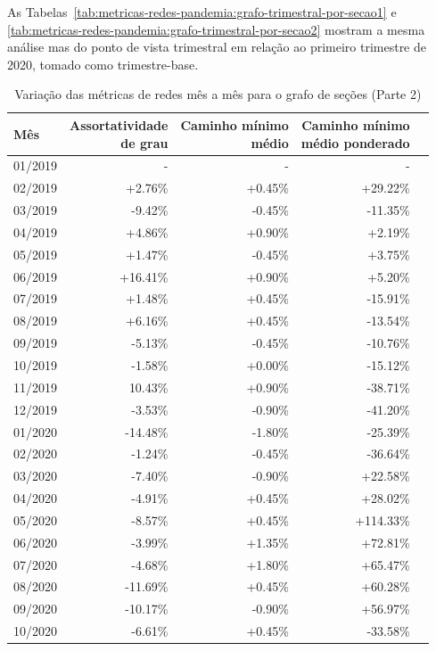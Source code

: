As Tabelas~\ref{tab:metricas-redes-pandemia:grafo-trimestral-por-secao1} e \ref{tab:metricas-redes-pandemia:grafo-trimestral-por-secao2} mostram a mesma análise mas do ponto de vista trimestral em relação ao primeiro trimestre de 2020, tomado como trimestre-base.

\begin{table}[htb]
\centering
\caption{Variação das métricas de redes mês a mês para o grafo de seções (Parte 2)}
\label{tab:metricas-redes-pandemia:grafo-mensal-por-secao2}
\begin{tabular}{l|rrrr}
\toprule
Mês & \shortstack{Assortatividade\\de grau} & \shortstack{Caminho mínimo\\médio} & \shortstack{Caminho mínimo\\médio ponderado} \\
\midrule
01/2019 &  - &  - &  - \\
02/2019 &  +2.76\% & +0.45\% & +29.22\% \\
03/2019 &  -9.42\% & -0.45\% & -11.35\% \\
04/2019 &  +4.86\% & +0.90\% &  +2.19\% \\
05/2019 &  +1.47\% & -0.45\% &  +3.75\% \\
06/2019 & +16.41\% & +0.90\% &  +5.20\% \\
07/2019 &  +1.48\% & +0.45\% & -15.91\% \\
08/2019 &  +6.16\% & +0.45\% & -13.54\% \\
09/2019 &  -5.13\% & -0.45\% & -10.76\% \\
10/2019 &  -1.58\% & +0.00\% & -15.12\% \\
11/2019 &  10.43\% & +0.90\% & -38.71\% \\
12/2019 &  -3.53\% & -0.90\% & -41.20\% \\
01/2020 & -14.48\% & -1.80\% & -25.39\% \\
02/2020 &  -1.24\% & -0.45\% & -36.64\% \\
03/2020 &  -7.40\% & -0.90\% & +22.58\% \\
04/2020 &  -4.91\% & +0.45\% & +28.02\% \\
05/2020 &  -8.57\% & +0.45\% & +114.33\% \\
06/2020 &  -3.99\% & +1.35\% & +72.81\% \\
07/2020 &  -4.68\% & +1.80\% & +65.47\% \\
08/2020 & -11.69\% & +0.45\% & +60.28\% \\
09/2020 & -10.17\% & -0.90\% & +56.97\% \\
10/2020 &  -6.61\% & +0.45\% & -33.58\% \\
\bottomrule
\end{tabular}
\fdadospesquisa
\end{table}

